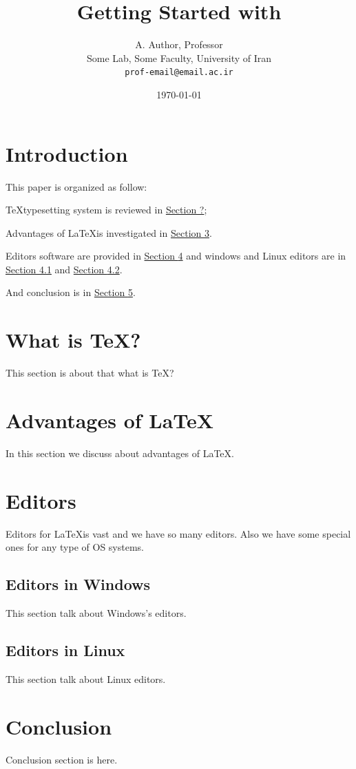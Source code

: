 \documentclass[12pt]{article}
\newcommand{\myHyperref}[2]{\hyperref[#1]{#2 \ref*{#1}}} %
\begin{document}
	\title{Getting Started with \LaTeXe}
	
	\author{A. Author, Professor\\ Some Lab, Some Faculty, University of Iran\\ \texttt{prof-email@email.ac.ir}}
	
	\date{\today}
	
	\maketitle	
	\pagebreak
	
	
	
	
	\section{Introduction} \label{intro}
	{\noindent
	This paper is organized as follow:
	
	\TeX typesetting system is reviewed in \hyperref[what is tex?]{Section ?}; %
	
	  Advantages of \LaTeX is investigated in \myHyperref{advantages}{Section}.
	
	Editors software are provided in \myHyperref{editors}{Section} and windows and Linux editors are in \myHyperref{editor.win}{Section} and \myHyperref{editor.linux}{Section}.
	
	And conclusion is in \myHyperref{conclusion}{Section}.
	}
	
	
	
	
	
	\section{What is \TeX?} \label{what is tex?}
		This section is about that what is \TeX?
	
	\section{Advantages of \LaTeX}\label{advantages}
		In this section we discuss about advantages of \LaTeX.

	\section{Editors} \label{editors}
		Editors for \LaTeX is vast and we have so many editors. Also we have some special ones for any type of OS systems.
	
	\subsection{Editors in Windows} \label{editor.win} %
		This section talk about Windows's editors.
	
	\subsection{Editors in Linux} \label{editor.linux} 
		This section talk about Linux editors.
	
	\section{Conclusion} \label{conclusion}
		Conclusion section is here.
\end{document}
